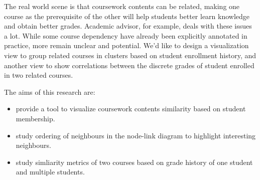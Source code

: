 
The real world scene is that coursework contents can be related, making one course as the prerequisite of the other will help students better learn knowledge and obtain better grades. Academic advisor, for example, deals with these issues a lot.
While some course dependency have already been explicitly annotated in practice, more remain unclear and potential. We'd like to design a visualization view to group related courses in clusters based on student enrollment history, and another view to show correlations between the discrete grades of student enrolled in two related courses.

The aims of this research are:
\begin{itemize}
  \item provide a tool to visualize coursework contents similarity based on student membership.
  \item study ordering of neighbours in the node-link diagram to highlight interesting neighbours. 
  \item study simliarity metrics of two courses based on grade history of one student and multiple students.
\end{itemize}
